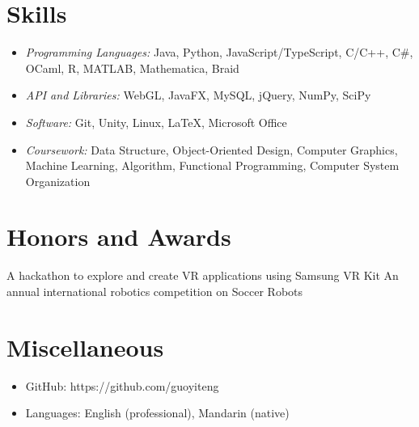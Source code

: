 \documentclass{resume}
\begin{document}

\section{Skills}
\begin{itemize}[parsep=0.5ex]
  \item \textit{Programming Languages:} Java, Python, JavaScript/TypeScript, C/C++, C\#, OCaml, R, MATLAB, Mathematica, Braid
  \item \textit{API and Libraries:} WebGL, JavaFX, MySQL, jQuery, NumPy, SciPy
  \item \textit{Software: }Git, Unity, Linux, \LaTeX, Microsoft Office
  \item \textit{Coursework: }Data Structure, Object-Oriented Design, Computer Graphics, Machine Learning, Algorithm, Functional Programming, Computer System Organization
\end{itemize}

\section{Honors and Awards}
A hackathon to explore and create VR applications using Samsung VR Kit
An annual international robotics competition on Soccer Robots
\section{Miscellaneous}
\begin{itemize}[parsep=0.5ex]
  \item GitHub: https://github.com/guoyiteng
  \item Languages: English (professional), Mandarin (native)
\end{itemize}

%
%
\end{document}
